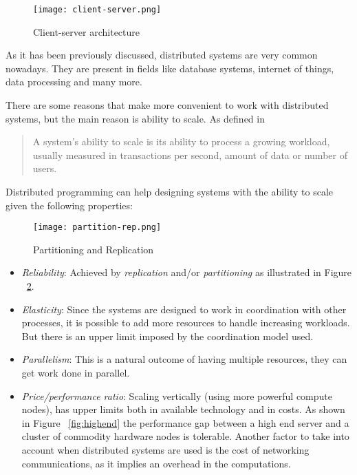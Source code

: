 \begin{figure}[!h]
\begin{center}
\texttt{[image: client-server.png]}
\caption{Client-server architecture}
\label{fig:client-server}
\end{center}
\end{figure}

As it has been previously discussed, distributed systems are very common
nowadays. They are present in fields like database systems, internet of things,
data processing and many more.

There are some reasons that make more convenient to work with distributed
systems, but the main reason is ability to scale. As defined in \cite{cloudadmin}
\begin{quote}
  A system's ability to scale is its ability to process a growing workload,
  usually measured in transactions per second, amount of data or number of
  users.
\end{quote}

Distributed programming can help designing systems with the ability to scale given
the following properties:

\begin{figure}[!h]
\begin{center}
\texttt{[image: partition-rep.png]}
\caption{Partitioning and Replication}
\label{fig:partitioning}
\end{center}
\end{figure}

\begin{itemize}
\item \textit{Reliability}: Achieved by \textit{replication} and/or
  \textit{partitioning} as illustrated in Figure ~\ref{fig:partitioning}.
\item \textit{Elasticity}: Since the systems are designed to work in
  coordination with other processes, it is possible to add more resources to
  handle increasing workloads. But there is an upper limit imposed by the
  coordination model used.
\item \textit{Parallelism}: This is a natural outcome of having multiple resources, they
  can get work done in parallel.
\item \textit{Price/performance ratio}: Scaling vertically (using more powerful
  compute nodes), has upper limits both in available technology and in costs. As
  shown in Figure ~\ref{fig:highend} the performance gap between a high end
  server and a cluster of commodity hardware nodes is tolerable. Another factor
  to take into account when distributed systems are used is the cost of
  networking communications, as it implies an overhead in the computations.
\end{itemize}


